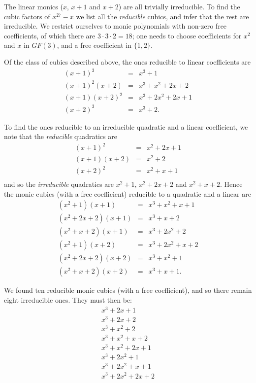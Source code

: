 \documentclass[11pt]{article} \usepackage{amssymb}
\begin{document}
\begin{enumerate}
\begin{enumerate}
    The linear monics ($x$, $x+1$ and $x+2$) are all
    trivially irreducible. To find the cubic factors of $x^{27}-x$ we list all 
    the {\em reducible} cubics, and infer that the rest are irreducible. 
    We restrict
    ourselves to monic polynomials with non-zero free coefficients, of which
    there are $3 \cdot 3 \cdot 2=18$; one needs to choose coefficients 
    for $x^2$ and $x$ in $GF(3)$, and a free coefficient in $\{1,2\}$.
    
    Of the class of cubics described above, the ones reducible to linear
    coefficients are
    \begin{eqnarray*}
      (x + 1)^3 &=& x^3 + 1\\
      (x + 1)^2(x + 2) &=& x^3 + x^2 + 2x + 2\\
      (x + 1)(x + 2)^2 &=& x^3 + 2x^2 + 2x + 1\\
      (x + 2)^3 &=& x^3 + 2.
    \end{eqnarray*}

    To find the ones reducible to an irreducible quadratic and a linear 
    coefficient, we note that the {\em reducible} quadratics are
    \begin{eqnarray*}
      (x+1)^2 &=& x^2+2x+1\\
      (x+1)(x+2) &=& x^2+2\\
      (x+2)^2 &=& x^2+x+1\\
    \end{eqnarray*}
    and so the {\em irreducible} quadratics are  $x^2+1$, $x^2+2x+2$ and 
    $x^2+x+2$. Hence the monic cubics (with a free coefficient) reducible to a 
    quadratic and a linear are
    \begin{eqnarray*}
      (x^2 + 1)(x + 1) &=& x^3 + x^2 + x + 1\\
      (x^2 + 2x + 2)(x + 1) &=& x^3 + x + 2\\
      (x^2 + x + 2)(x + 1) &=& x^3 + 2x^2 + 2\\
      (x^2 + 1)(x + 2) &=& x^3 + 2x^2 + x + 2\\
      (x^2 + 2x + 2)(x + 2) &=& x^3 + x^2 + 1\\
      (x^2 + x + 2)(x + 2) &=& x^3 + x + 1.
    \end{eqnarray*}

    We found ten reducible monic cubics (with a free coefficient), and so
    there remain eight irreducible ones. They must then be:
    \begin{eqnarray*}
      x^3 + 2x + 1\\
      x^3 + 2x + 2\\
      x^3 + x^2 + 2\\
      x^3 + x^2 + x + 2\\
      x^3 + x^2 + 2x + 1\\
      x^3 + 2x^2 + 1\\
      x^3 + 2x^2 + x + 1\\
      x^3 + 2x^2 + 2x + 2\\
    \end{eqnarray*}


\end{enumerate}
\end{enumerate}
\end{document}
